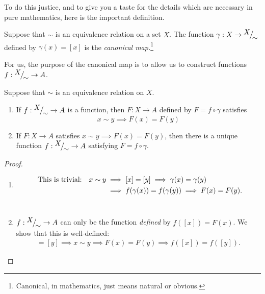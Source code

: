 
To do this justice, and to give you a taste for the details which are necessary in pure mathematics, here is the important definition.

\begin{defn}{}{}
	Suppose that $\sim$ is an equivalence relation on a set $X$. The function $\gamma:X\to {}^{\textstyle {X}}\!\big/_{\textstyle \!{\sim}}$ defined by $\gamma(x)=[x]$ is the \emph{canonical map.}\footnote{Canonical, in mathematics, just means natural or obvious.}
\end{defn}

For us, the purpose of the canonical map is to allow us to construct functions $f:{}^{\textstyle {X}}\!\big/_{\textstyle \!{\sim}}\to A$.

\begin{thm}{}{}
	Suppose that $\sim$ is an equivalence relation on $X$.
	\begin{enumerate}
  	\item If $f:{}^{\textstyle {X}}\!\big/_{\textstyle \!{\sim}}\to A$ is a function, then $F:X\to A$ defined by $F=f\circ\gamma$ satisfies
  	\[
  		x\sim y\implies F(x)=F(y)
  	\]
  	\item If $F:X\to A$ satisfies $x\sim y\implies F(x)=F(y)$, then there is a unique function $f:{}^{\textstyle {X}}\!\big/_{\textstyle \!{\sim}}\to A$ satisfying $F=f\circ\gamma$.
	\end{enumerate}
\end{thm}

\begin{proof}
\begin{enumerate}
  \item\begin{align*}
	\hspace{4.3pt}\text{This is trivial:}\quad x\sim y&\implies [x]=[y]\implies \gamma(x)=\gamma(y)\\
	&\implies f(\gamma(x))=f(\gamma(y))\implies F(x)=F(y).
	\end{align*}\
	\item $f:{}^{\textstyle {X}}\!\big/_{\textstyle \!{\sim}}\to A$ can only be the function \emph{defined} by $f([x])=F(x)$. We show that this is well-defined:
	\begin{gather*}
	[x]=[y]\implies x\sim y\implies F(x)=F(y)\implies f([x])=f([y]).\tag*{\qedhere}
	\end{gather*}
\end{enumerate}
\end{proof}

